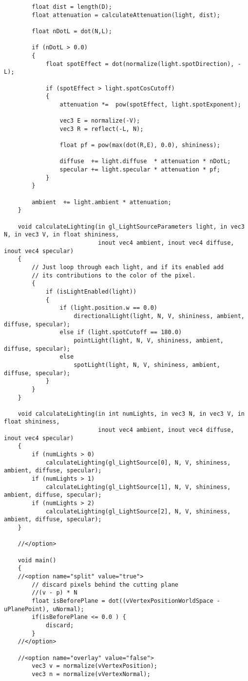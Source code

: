 \begin{verbatim}
		float dist = length(D);
		float attenuation = calculateAttenuation(light, dist);

		float nDotL = dot(N,L);

		if (nDotL > 0.0)
		{   
			float spotEffect = dot(normalize(light.spotDirection), -L);
	       
			if (spotEffect > light.spotCosCutoff)
			{
				attenuation *=  pow(spotEffect, light.spotExponent);

				vec3 E = normalize(-V);
				vec3 R = reflect(-L, N);
	       
				float pf = pow(max(dot(R,E), 0.0), shininess);

				diffuse  += light.diffuse  * attenuation * nDotL;
				specular += light.specular * attenuation * pf;
			}
		}
	   
		ambient  += light.ambient * attenuation;
	}
	
	void calculateLighting(in gl_LightSourceParameters light, in vec3 N, in vec3 V, in float shininess,
						   inout vec4 ambient, inout vec4 diffuse, inout vec4 specular)
	{
		// Just loop through each light, and if its enabled add
		// its contributions to the color of the pixel.
		{
			if (isLightEnabled(light))
			{
				if (light.position.w == 0.0)
					directionalLight(light, N, V, shininess, ambient, diffuse, specular);
				else if (light.spotCutoff == 180.0)
					pointLight(light, N, V, shininess, ambient, diffuse, specular);
				else
					spotLight(light, N, V, shininess, ambient, diffuse, specular);
			}
		}
	}
				
	void calculateLighting(in int numLights, in vec3 N, in vec3 V, in float shininess,
						   inout vec4 ambient, inout vec4 diffuse, inout vec4 specular)
	{
		if (numLights > 0)
			calculateLighting(gl_LightSource[0], N, V, shininess, ambient, diffuse, specular);
		if (numLights > 1)
			calculateLighting(gl_LightSource[1], N, V, shininess, ambient, diffuse, specular);
		if (numLights > 2)
			calculateLighting(gl_LightSource[2], N, V, shininess, ambient, diffuse, specular);
	}
	
	//</option>

	void main()
	{		
	//<option name="split" value="true">
		// discard pixels behind the cutting plane
	    //(v - p) * N
		float isBeforePlane = dot((vVertexPositionWorldSpace - uPlanePoint), uNormal);		
		if(isBeforePlane <= 0.0 ) {
			discard;
		}
	//</option>

	//<option name="overlay" value="false">
		vec3 v = normalize(vVertexPosition);
		vec3 n = normalize(vVertexNormal);
		

\end{verbatim}
